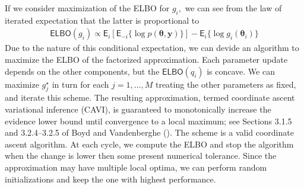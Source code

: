 \documentclass[
  11pt,
  letterpaper,
]{scrbook}
\theoremstyle{definition}
\theoremstyle{definition}
\theoremstyle{definition}
\theoremstyle{plain}
\theoremstyle{plain}
\theoremstyle{plain}
\theoremstyle{remark}
\begin{document}
If we consider maximization of the ELBO for \(g_i,\) we can see from the
law of iterated expectation that the latter is proportional to
\begin{align*}
 \mathsf{ELBO}(g_i) \propto \mathsf{E}_i \left[ \mathsf{E}_{-i} \{\log p(\boldsymbol{\theta}, \boldsymbol{y}) \}\right] - \mathsf{E}_i\{\log g_i(\boldsymbol{\theta}_i)\}
\end{align*} Due to the nature of this conditional expectation, we can
devide an algorithm to maximize the ELBO of the factorized
approximation. Each parameter update depends on the other components,
but the \(\mathsf{ELBO}(q_i)\) is concave. We can maximize
\(g^{\star}_j\) in turn for each \(j=1, \ldots, M\) treating the other
parameters as fixed, and iterate this scheme. The resulting
approximation, termed coordinate ascent variational inference (CAVI), is
guaranteed to monotonically increase the evidence lower bound until
convergence to a local maximum; see Sections 3.1.5 and 3.2.4--3.2.5 of
Boyd and Vandenberghe (). The
scheme is a valid coordinate ascent algorithm. At each cycle, we compute
the ELBO and stop the algorithm when the change is lower then some
present numerical tolerance. Since the approximation may have multiple
local optima, we can perform random initializations and keep the one
with highest performance.
\end{document}
